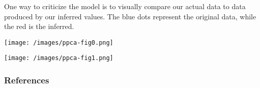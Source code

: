 One way to criticize the model is to visually compare our actual data to data produced by our inferred values. The blue dots represent the original data, while the red is the inferred.

\texttt{[image: /images/ppca-fig0.png]}

\texttt{[image: /images/ppca-fig1.png]}

\subsubsection{References}\label{references}
